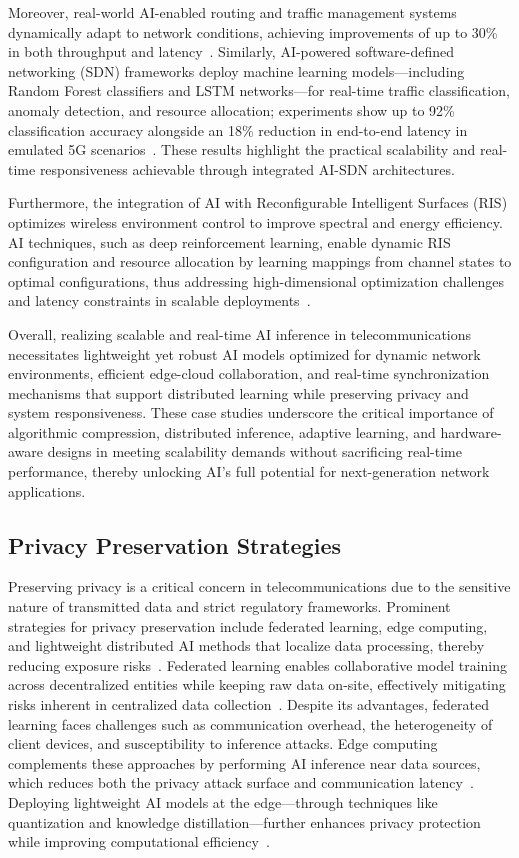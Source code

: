 \documentclass[sigconf]{acmart}
\begin{document}
Moreover, real-world AI-enabled routing and traffic management systems dynamically adapt to network conditions, achieving improvements of up to 30\% in both throughput and latency~\cite{ref53}. Similarly, AI-powered software-defined networking (SDN) frameworks deploy machine learning models—including Random Forest classifiers and LSTM networks—for real-time traffic classification, anomaly detection, and resource allocation; experiments show up to 92\% classification accuracy alongside an 18\% reduction in end-to-end latency in emulated 5G scenarios~\cite{ref52}. These results highlight the practical scalability and real-time responsiveness achievable through integrated AI-SDN architectures.

Furthermore, the integration of AI with Reconfigurable Intelligent Surfaces (RIS) optimizes wireless environment control to improve spectral and energy efficiency. AI techniques, such as deep reinforcement learning, enable dynamic RIS configuration and resource allocation by learning mappings from channel states to optimal configurations, thus addressing high-dimensional optimization challenges and latency constraints in scalable deployments~\cite{ref49}.

Overall, realizing scalable and real-time AI inference in telecommunications necessitates lightweight yet robust AI models optimized for dynamic network environments, efficient edge-cloud collaboration, and real-time synchronization mechanisms that support distributed learning while preserving privacy and system responsiveness. These case studies underscore the critical importance of algorithmic compression, distributed inference, adaptive learning, and hardware-aware designs in meeting scalability demands without sacrificing real-time performance, thereby unlocking AI's full potential for next-generation network applications.

\subsection{Privacy Preservation Strategies}

Preserving privacy is a critical concern in telecommunications due to the sensitive nature of transmitted data and strict regulatory frameworks. Prominent strategies for privacy preservation include federated learning, edge computing, and lightweight distributed AI methods that localize data processing, thereby reducing exposure risks~\cite{ref48,ref49,ref50,ref52}. Federated learning enables collaborative model training across decentralized entities while keeping raw data on-site, effectively mitigating risks inherent in centralized data collection~\cite{ref49}. Despite its advantages, federated learning faces challenges such as communication overhead, the heterogeneity of client devices, and susceptibility to inference attacks. Edge computing complements these approaches by performing AI inference near data sources, which reduces both the privacy attack surface and communication latency~\cite{ref52}. Deploying lightweight AI models at the edge—through techniques like quantization and knowledge distillation—further enhances privacy protection while improving computational efficiency~\cite{ref50}.
\end{document}
